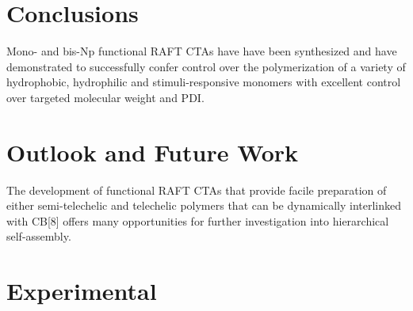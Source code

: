 \documentclass[a4wide,12pt]{report} %
\begin{document}



\chapter{Conclusions}




Mono- and bis-Np functional RAFT CTAs have have been synthesized and have demonstrated to successfully confer control over the polymerization of a variety of hydrophobic, hydrophilic and stimuli-responsive monomers with excellent control over targeted molecular weight and PDI. 






\chapter{Outlook and Future Work}


The development of functional RAFT CTAs that provide facile preparation of either semi-telechelic and telechelic polymers that can be dynamically interlinked with CB[8] offers many opportunities for further investigation into hierarchical self-assembly.






\chapter{Experimental}



\end{document}
